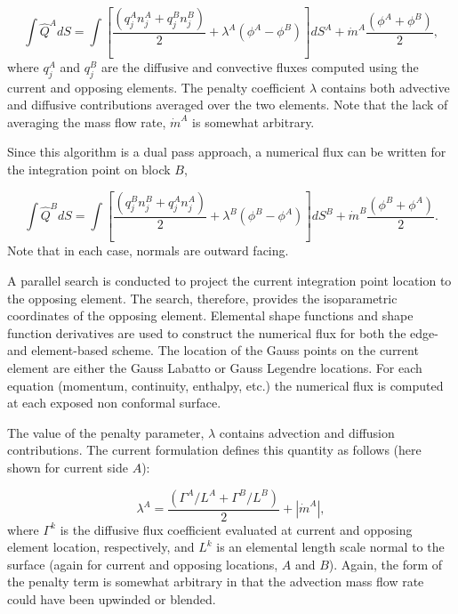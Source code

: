 \begin{equation} 
        \int \hat Q^A dS = \int [\frac{(q_j^A n_j^A + q_j^B n_j^B)}{2}
				+ \lambda^A ( \phi^A - \phi^B) ]dS^A
        				+ \dot{m}^A \frac{(\phi^A + \phi^B)}{2},
\label{numericalFluxA}
\end{equation}
where $q_j^A$ and $q_j^B$ are the diffusive and convective fluxes computed using the current and opposing elements. The penalty coefficient $\lambda$ contains both advective and diffusive contributions averaged over the two elements. Note that the lack of averaging the mass flow rate, 
$\dot{m}^A$ is somewhat arbitrary.

Since this algorithm is a dual pass approach, a numerical flux can be written for the integration point on block $B$,

\begin{equation} 
        \int \hat Q^B dS = \int [\frac{(q_j^B n_j^B + q_j^A n_j^A)}{2} 
				+ \lambda^B ( \phi^B - \phi^A) ]dS^B
				+ \dot{m}^B \frac{(\phi^B + \phi^A)}{2}.
\label{numericalFluxB}
\end{equation}
Note that in each case, normals are outward facing.

A parallel search is conducted to project the current integration point location to the opposing element. The search, therefore, provides the isoparametric coordinates of the opposing element. Elemental shape functions and shape function derivatives are used to construct the numerical flux for both the edge- and element-based scheme. The location of the Gauss points on the current element are either the Gauss Labatto or Gauss Legendre locations. For each equation (momentum, continuity, enthalpy, etc.) the numerical flux is computed at each exposed non conformal surface.

The value of the penalty parameter, $\lambda$ contains advection and diffusion contributions. The current formulation defines this quantity as follows (here shown for current side $A$):

\begin{equation} 
        \lambda^A = \frac{(\Gamma^A / L^A + \Gamma^B / L^B )}{2} + |\dot{m}^A|,
\label{lamdbaA}
\end{equation}
where $\Gamma^k$ is the diffusive flux coefficient evaluated at current and opposing element location, respectively, and $L^k$ is an elemental length scale normal to the surface (again for current and opposing locations, $A$ and $B$). Again, the form of the penalty term is somewhat arbitrary in that the advection mass flow rate could have been upwinded or blended.

